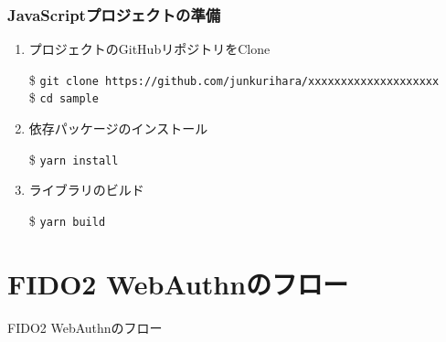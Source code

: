 \documentclass[12pt,dvipdfmx,uplatex]{beamer}
\begin{document}
\begin{frame}
\frametitle{JavaScriptプロジェクトの準備}
\begin{enumerate}
\item \alert{プロジェクトのGitHubリポジトリをClone}\\
\begin{exampleblock}{}
\footnotesize
\$ \texttt{git clone https://github.com/junkurihara/xxxxxxxxxxxxxxxxxxxx}\\
\$ \texttt{cd sample}
\end{exampleblock}
\item 依存パッケージのインストール
\begin{exampleblock}{}
\$ \texttt{yarn install}
\end{exampleblock}
\item ライブラリのビルド
\begin{exampleblock}{}
\$ \texttt{yarn build}
\end{exampleblock}
\end{enumerate}
\end{frame}


\section{FIDO2 WebAuthnのフロー}
\begin{frame}
\centering
{\Large FIDO2 WebAuthnのフロー}
\end{frame}
\end{document}
